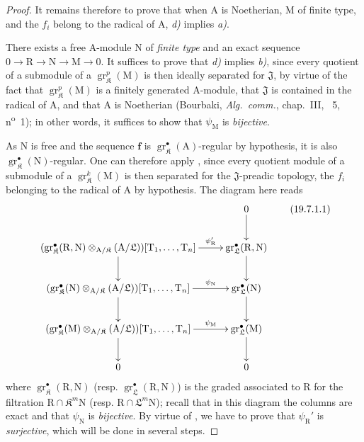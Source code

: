 \begin{proof}
It remains therefore to prove that when $\mathrm{A}$ is Noetherian, $\mathrm{M}$ of finite type, and the $f_i$ belong to the radical of $\mathrm{A}$, \emph{d)} implies \emph{a)}.

There exists a free $\mathrm{A}$-module $\mathrm{N}$ of \emph{finite type} and an exact sequence $0\to\mathrm{R}\to\mathrm{N}\to\mathrm{M}\to 0$. It suffices to prove that \emph{d)} implies \emph{b)}, since every quotient of a submodule of a $\operatorname{gr}_\mathfrak K^p(\mathrm{M})$ is then ideally separated for $\mathfrak{J}$, by virtue of the fact that $\operatorname{gr}_\mathfrak K^p(\mathrm{M})$ is a finitely generated $\mathrm{A}$-module, that $\mathfrak{J}$ is contained in the radical of $\mathrm{A}$, and that $\mathrm{A}$ is Noetherian (Bourbaki, \emph{Alg.~comm.}, chap.~III, \textsection~5, n\textsuperscript{o}~1); in other words, it suffices to show that $\psi_\mathrm{M}$ is \emph{bijective}.

As $\mathrm{N}$ is free and the sequence $\mathbf{f}$ is $\operatorname{gr}_\mathfrak K^\bullet(\mathrm{A})$-regular by hypothesis, it is also $\operatorname{gr}_\mathfrak K^\bullet(\mathrm{N})$-regular. One can therefore apply , since every quotient module of a submodule of a $\operatorname{gr}_\mathfrak K^k(\mathrm{M})$ is then separated for the $\mathfrak{J}$-preadic topology, the $f_i$ belonging to the radical of $\mathrm{A}$ by hypothesis. The diagram  here reads
\[
\xymatrix{
  & 0 \ar[d] \\
  (\operatorname{gr}_\mathfrak K^\bullet(\mathrm{R},\mathrm{N})\otimes_{\mathrm{A}/\mathfrak K}(\mathrm{A}/\mathfrak{L}))[\mathrm{T}_1,\ldots,\mathrm{T}_n] \ar[r]^-{\psi_\mathrm{R}'} \ar[d] & \operatorname{gr}_\mathfrak{L}^\bullet(\mathrm{R},\mathrm{N}) \ar[d] \\
  (\operatorname{gr}_\mathfrak K^\bullet(\mathrm{N})\otimes_{\mathrm{A}/\mathfrak K}(\mathrm{A}/\mathfrak{L}))[\mathrm{T}_1,\ldots,\mathrm{T}_n] \ar[r]^-{\psi_\mathrm{N}} \ar[d] & \operatorname{gr}_\mathfrak{L}^\bullet(\mathrm{N}) \ar[d] \\
  (\operatorname{gr}_\mathfrak K^\bullet(\mathrm{M})\otimes_{\mathrm{A}/\mathfrak K}(\mathrm{A}/\mathfrak{L}))[\mathrm{T}_1,\ldots,\mathrm{T}_n] \ar[r]^-{\psi_\mathrm{M}} \ar[d] & \operatorname{gr}_\mathfrak{L}^\bullet(\mathrm{M}) \ar[d] \\
  0 & 0
}
\tag{19.7.1.1}
\label{IV.19.7.1.1}
\]
where $\operatorname{gr}_\mathfrak K^\bullet(\mathrm{R},\mathrm{N})$ (resp. $\operatorname{gr}_\mathfrak{L}^\bullet(\mathrm{R},\mathrm{N})$) is the graded associated to $\mathrm{R}$ for the filtration $\mathrm{R}\cap\mathfrak K^m\mathrm{N}$ (resp. $\mathrm{R}\cap\mathfrak{L}^m\mathrm{N}$); recall that in this diagram the columns are exact and that $\psi_\mathrm{N}$ is \emph{bijective}.
By virtue of , we have to prove that $\psi_\mathrm{R}'$ is \emph{surjective}, which will be done in several steps.


\end{proof}
